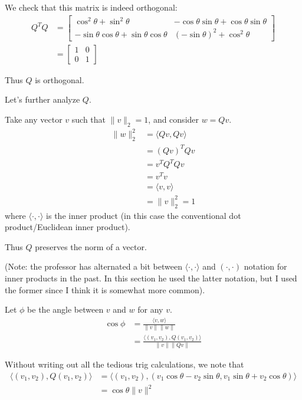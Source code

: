 \documentclass[12pt,letterpaper]{article}
\begin{document}
We check that this matrix is indeed orthogonal:
\begin{align}
Q^T Q &= \begin{bmatrix}
	\cos^2\theta + \sin^2\theta & -\cos\theta\sin\theta+\cos\theta\sin\theta \\
	-\sin\theta\cos\theta+\sin\theta\cos\theta & (-\sin\theta)^2 + \cos^2\theta
\end{bmatrix} \\
&=
\begin{bmatrix}
	1 & 0 \\
	0 & 1
\end{bmatrix}
\end{align}

Thus $Q$ is orthogonal.

Let's further analyze $Q$.

Take any vector $v$ such that $\lVert v \rVert_2 = 1$, and consider $w = Qv$.
\begin{align}
	\lVert w \rVert_2^2 &= \langle Qv, Qv \rangle \\
	&= (Qv)^T Qv \\
	&= v^T Q^T Q v \\
	&= v^T v \\
	&= \langle v, v \rangle \\
	&= \lVert v \rVert_2^2 = 1
\end{align}
where $\langle \cdot, \cdot \rangle$ is the inner product (in this case the conventional dot product/Euclidean inner product).

Thus $Q$ preserves the norm of a vector.

(Note: the professor has alternated a bit between $\langle \cdot, \cdot \rangle$ and $( \cdot, \cdot )$ notation for inner products in the past. In this section he used the latter notation, but I used the former since I think it is somewhat more common).

Let $\phi$ be the angle between $v$ and $w$ for any $v$.
\begin{align}
	\cos\phi &= \frac{\langle v, w \rangle}{\lVert v \rVert \lVert w \rVert} \\
	&= \frac{\big\langle (v_1, v_2), Q(v_1,v_2) \big\rangle}{\lVert v \rVert \lVert Q v \rVert}
\end{align}

Without writing out all the tedious trig calculations, we note that
\begin{align}
	\big\langle (v_1, v_2), Q(v_1,v_2) \big\rangle
	&= \big\langle (v_1, v_2), (v_1 \cos\theta - v_2 \sin\theta, v_1\sin\theta + v_2\cos\theta) \big\rangle \\
	&= \cos\theta \lVert v \rVert^2
\end{align}
\end{document}
